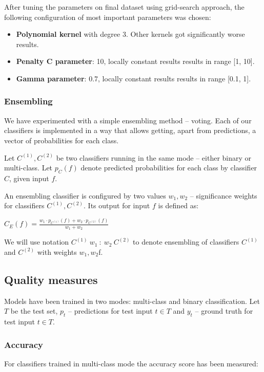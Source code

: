         After tuning the parameters on final dataset using grid-search approach, the following configuration of most important parameters was chosen:
        \begin{itemize}
            \item \textbf{Polynomial kernel} with degree 3. Other kernels got significantly worse results.
            \item \textbf{Penalty C parameter}: 10, locally constant results results in range [1, 10].
            \item \textbf{Gamma parameter}: 0.7, locally constant results results in range [0.1, 1].
        \end{itemize}

        \subsubsection{Ensembling}
        We have experimented with a simple ensembling method -- voting.
        Each of our classifiers is implemented in a way that allows getting,
        apart from predictions, a vector of probabilities for each class.

        Let $C^{(1)}, C^{(2)}$ be two classifiers running in the same mode -- either
        binary or multi-class.
        Let $p_{C}(f)$ denote predicted probabilities for each class by classifier $C$,
        given input $f$.

        An ensembling classifier is configured by two values $w_1, w_2$ -- significance
        weights for classifiers $C^{(1)}, C^{(2)}$. Its output for input $f$ is defined as:
        \begin{center}
        $C_{E}(f) = \frac{w_{1} \cdot p_{C^{(1)}}(f) + w_{2} \cdot p_{C^{(2)}}(f)}{w_{1} + w_{2}}$
        \end{center}

        We will use notation $C^{(1)}\ w_{1}\ :\ w_{2}\ C^{(2)}$ to denote ensembling
        of classifiers $C^{(1)}$ and $C^{(2)}$ with weights $w_{1}, w_{2}$f.


    \subsection{Quality measures}
        Models have been trained in two modes: multi-class and binary
        classification. Let $T$ be the test set, $p_t$ -- predictions for test input
        $t \in T$ and $y_t$ -- ground truth for test input $t \in T$.
        \subsubsection*{Accuracy}
        For classifiers trained in multi-class mode the accuracy score has been
        measured:

